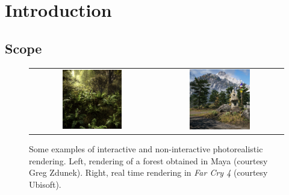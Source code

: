 \chapter{Introduction}
\label{sec:intro}
\section{Scope}
\begin{figure}
\centering
\begin{tabular}{@{}c@{}c@{}}
	 \includegraphics[width=0.5\textwidth]{figures/forest-maya-crop.jpg} & 	 \includegraphics[width=0.5\textwidth]{figures/far-cry-4-crop.jpg} \\
\end{tabular}
\caption{Some examples of interactive and non-interactive photorealistic rendering. Left, rendering of a forest obtained in Maya (courtesy Greg Zdunek). Right, real time rendering in \emph{Far Cry 4} (courtesy Ubisoft). } 
\label{fig:main_examples}
\end{figure}

